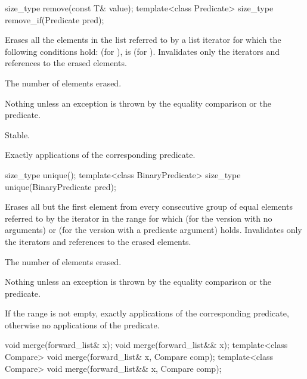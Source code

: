 %
%
\begin{itemdecl}
size_type remove(const T& value);
template<class Predicate> size_type remove_if(Predicate pred);
\end{itemdecl}

\begin{itemdescr}
\pnum
\effects Erases all the elements in the list referred to by a list iterator  for
which the following conditions hold:  (for ),
 is  (for ).
Invalidates only the iterators and references to the erased elements.

\pnum
\returns The number of elements erased.

\pnum
\throws Nothing unless an exception is thrown by the equality comparison or the
predicate.

\pnum
\remarks Stable.

\pnum
\complexity Exactly  applications of the corresponding
predicate.
\end{itemdescr}

%
\begin{itemdecl}
size_type unique();
template<class BinaryPredicate> size_type unique(BinaryPredicate pred);
\end{itemdecl}

\begin{itemdescr}
\pnum
\effects Erases all but the first element from every consecutive
group of equal elements referred to by the iterator  in the range  for which  (for the version with no arguments) or  (for the version with a predicate argument) holds.
Invalidates only the iterators and references to the erased elements.

\pnum
\returns The number of elements erased.

\pnum
\throws Nothing unless an exception is thrown by the equality comparison or the predicate.

\pnum
\complexity If the range  is not empty, exactly  applications of the corresponding predicate, otherwise no applications of the predicate.
\end{itemdescr}

%
\begin{itemdecl}
void merge(forward_list& x);
void merge(forward_list&& x);
template<class Compare> void merge(forward_list& x, Compare comp);
template<class Compare> void merge(forward_list&& x, Compare comp);
\end{itemdecl}

